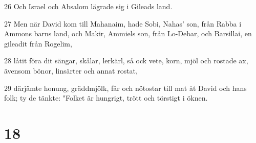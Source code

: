 \par 26 Och Israel och Absalom lägrade sig i Gileads land.
\par 27 Men när David kom till Mahanaim, hade Sobi, Nahas' son, från Rabba i Ammons barns land, och Makir, Ammiels son, från Lo-Debar, och Barsillai, en gileadit från Rogelim,
\par 28 låtit föra dit sängar, skålar, lerkärl, så ock vete, korn, mjöl och rostade ax, ävensom bönor, linsärter och annat rostat,
\par 29 därjämte honung, gräddmjölk, får och nötostar till mat åt David och hans folk; ty de tänkte: "Folket är hungrigt, trött och törstigt i öknen.

\chapter{18}

